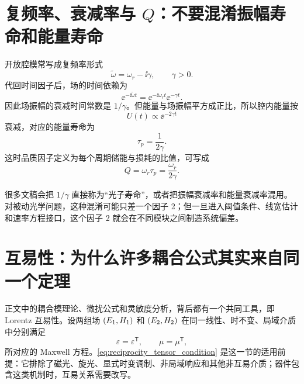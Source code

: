 \section{复频率、衰减率与 \texorpdfstring{$Q$}{Q}：不要混淆振幅寿命和能量寿命}
开放腔模常写成复频率形式
\begin{equation}
\tilde{\omega}=\omega_r-\ii\gamma,
\qquad \gamma>0.
\label{eq:complex_frequency_appendix}
\end{equation}
代回时间因子后，场的时间依赖为
\begin{equation}
\ee^{-\ii\tilde{\omega} t}
=
\ee^{-\ii\omega_r t}\ee^{-\gamma t}.
\end{equation}
因此场振幅的衰减时间常数是 $1/\gamma$。但能量与场振幅平方成正比，所以腔内能量按
\begin{equation}
U(t) \propto \ee^{-2\gamma t}
\end{equation}
衰减，对应的能量寿命为
\begin{equation}
\tau_p=\frac{1}{2\gamma}.
\label{eq:photon_lifetime_appendix}
\end{equation}
这时品质因子定义为每个周期储能与损耗的比值，可写成
\begin{equation}
Q = \omega_r\tau_p = \frac{\omega_r}{2\gamma}.
\label{eq:q_complexfreq_appendix}
\end{equation}

很多文稿会把 $1/\gamma$ 直接称为“光子寿命”，或者把振幅衰减率和能量衰减率混用。对被动光学问题，这种混淆可能只差一个因子 2；但一旦进入阈值条件、线宽估计和速率方程接口，这个因子 2 就会在不同模块之间制造系统偏差。

\section{互易性：为什么许多耦合公式其实来自同一个定理}
正文中的耦合模理论、微扰公式和灵敏度分析，背后都有一个共同工具，即 Lorentz 互易性。设两组场 $(E_1,H_1)$ 和 $(E_2,H_2)$ 在同一线性、时不变、局域介质中分别满足
\begin{equation}
\varepsilon=\varepsilon^{\mathsf T},
\qquad
\mu=\mu^{\mathsf T},
\label{eq:reciprocity_tensor_condition}
\end{equation}
所对应的 Maxwell 方程。\cref{eq:reciprocity_tensor_condition} 是这一节的适用前提：它排除了磁光、旋光、显式时变调制、非局域响应和其他非互易介质；器件包含这类机制时，互易关系需要改写。

